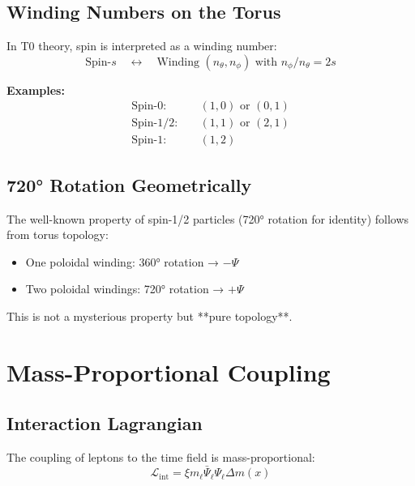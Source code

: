 	\subsection{Winding Numbers on the Torus}
	
	In T0 theory, spin is interpreted as a winding number:
	\begin{equation}
		\text{Spin-}s \quad \longleftrightarrow \quad 
		\text{Winding } (n_\theta, n_\phi) \text{ with } n_\phi/n_\theta = 2s
		\label{eq:spin_topology}
	\end{equation}
	
	\textbf{Examples:}
	\begin{align}
		\text{Spin-}0: &\quad (1, 0) \text{ or } (0, 1) \\
		\text{Spin-}1/2: &\quad (1, 1) \text{ or } (2, 1) \\
		\text{Spin-}1: &\quad (1, 2)
	\end{align}
	
	\subsection{720° Rotation Geometrically}
	
	The well-known property of spin-1/2 particles (720° rotation for identity) follows from torus topology:
	
	\begin{itemize}
		\item One poloidal winding: 360° rotation → $-\Psi$
		\item Two poloidal windings: 720° rotation → $+\Psi$
	\end{itemize}
	
	This is not a mysterious property but **pure topology**.
	
	\section{Mass-Proportional Coupling}
	
	\subsection{Interaction Lagrangian}
	
	The coupling of leptons to the time field is mass-proportional:
	\begin{equation}
		\mathcal{L}_{\text{int}} = \xi m_\ell \bar{\Psi}_\ell \Psi_\ell \Delta m(x)
		\label{eq:mass_proportional}
	\end{equation}
	
